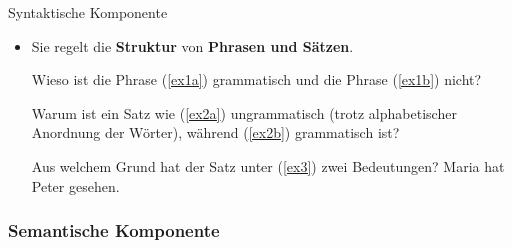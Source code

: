 \begin{frame}{Syntaktische Komponente}

\begin{itemize}
	\item Sie regelt die \textbf{Struktur} von \textbf{Phrasen und Sätzen}.

	\ea Wieso ist die Phrase (\ref{ex1a}) grammatisch und die Phrase (\ref{ex1b}) nicht?
	\label{ex1a}
	\label{ex1b}
	\z
	\z

	\ea Warum ist ein Satz wie (\ref{ex2a}) ungrammatisch (trotz alphabetischer Anordnung der Wörter), während (\ref{ex2b}) grammatisch ist?
	\label{ex2a}
	\label{ex2b}
	\z \z
	
	\ea Aus welchem Grund hat der Satz unter (\ref{ex3}) zwei Bedeutungen? 
	\ea Maria hat Peter gesehen.\label{ex3}
\z \z
			
\end{itemize}

\end{frame}


\subsubsection{Semantische Komponente}
		

